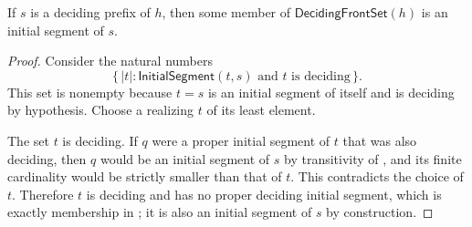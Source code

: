 \begin{helper}
If $s$ is a deciding prefix of $h$, then some member of
$\mathsf{DecidingFrontSet}(h)$ is an initial segment of $s$.
\end{helper}
\begin{proof}
Consider the natural numbers
\[
 \{\,\lvert t\rvert: \mathsf{InitialSegment}(t,s)\text{ and }t
 \text{ is deciding}\,\}.
\]
This set is nonempty because $t=s$ is an initial segment of itself and is
deciding by hypothesis.  Choose a realizing $t$ of its least element.

The set $t$ is deciding.  If $q$ were a proper initial segment of $t$ that
was also deciding, then $q$ would be an initial segment of $s$ by
transitivity of , and its finite cardinality would
be strictly smaller than that of $t$.  This contradicts the choice of
$t$.  Therefore $t$ is deciding and has no proper deciding initial segment,
which is exactly membership in ; it is also an
initial segment of $s$ by construction.
\end{proof}
